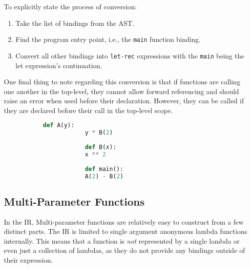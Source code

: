 \documentclass{l4proj}
\begin{document}
To explicitly state the process of conversion:

\begin{enumerate}
    \item Take the list of bindings from the AST.
    \item Find the program entry point, i.e., the \texttt{main} function binding.
    \item Convert all other bindings into \texttt{let-rec} expressions with the \texttt{main} being the let expression's continuation.
\end{enumerate}

One final thing to note regarding this conversion is that if functions are calling one another in the top-level, they cannot allow forward referencing and should raise an error when used before their declaration.
However, they can be called if they are declared before their call in the top-level scope.

\begin{figure}[]
\begin{center}
    \begin{subfigure}[]{0.65\textwidth}
        \begin{lstlisting}[language=Python, caption=Example of PyFunc program that will raise an error due to a forward reference of the function B.]
            def A(y):
            y * B(2)
            
            def B(x):
            x ** 2
            
            def main():
            A(2) - B(2)
        \end{lstlisting}
    \end{subfigure}
\end{center}
\end{figure}


\subsection*{Multi-Parameter Functions}

In the IR, Multi-parameter functions are relatively easy to construct from a few distinct parts.
The IR is limited to single argument anonymous lambda functions internally.
This means that a function is \emph{not} represented by a single lambda or even just a collection of lambdas, as they do not provide any bindings outside of their expression.
\end{document}
